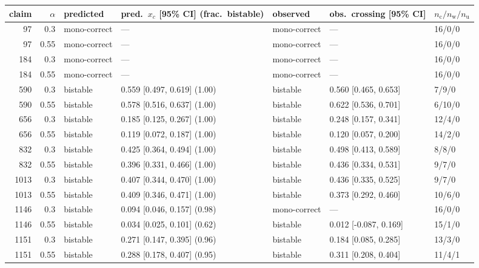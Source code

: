 \begin{tabular}{rrlllll}
\toprule
claim & $\alpha$ & predicted & pred.\ $x_c$ [95\% CI] (frac.\ bistable) & observed & obs.\ crossing [95\% CI] & $n_{\mathrm{c}}/n_{\mathrm{w}}/n_{\mathrm{u}}$ \\
\midrule
97 & 0.3 & mono-correct & --- & mono-correct & --- & 16/0/0 \\
97 & 0.55 & mono-correct & --- & mono-correct & --- & 16/0/0 \\
184 & 0.3 & mono-correct & --- & mono-correct & --- & 16/0/0 \\
184 & 0.55 & mono-correct & --- & mono-correct & --- & 16/0/0 \\
590 & 0.3 & bistable & 0.559 [0.497, 0.619] (1.00) & bistable & 0.560 [0.465, 0.653] & 7/9/0 \\
590 & 0.55 & bistable & 0.578 [0.516, 0.637] (1.00) & bistable & 0.622 [0.536, 0.701] & 6/10/0 \\
656 & 0.3 & bistable & 0.185 [0.125, 0.267] (1.00) & bistable & 0.248 [0.157, 0.341] & 12/4/0 \\
656 & 0.55 & bistable & 0.119 [0.072, 0.187] (1.00) & bistable & 0.120 [0.057, 0.200] & 14/2/0 \\
832 & 0.3 & bistable & 0.425 [0.364, 0.494] (1.00) & bistable & 0.498 [0.413, 0.589] & 8/8/0 \\
832 & 0.55 & bistable & 0.396 [0.331, 0.466] (1.00) & bistable & 0.436 [0.334, 0.531] & 9/7/0 \\
1013 & 0.3 & bistable & 0.407 [0.344, 0.470] (1.00) & bistable & 0.436 [0.335, 0.525] & 9/7/0 \\
1013 & 0.55 & bistable & 0.409 [0.346, 0.471] (1.00) & bistable & 0.373 [0.292, 0.460] & 10/6/0 \\
1146 & 0.3 & bistable & 0.094 [0.046, 0.157] (0.98) & mono-correct & --- & 16/0/0 \\
1146 & 0.55 & bistable & 0.034 [0.025, 0.101] (0.62) & bistable & 0.012 [-0.087, 0.169] & 15/1/0 \\
1151 & 0.3 & bistable & 0.271 [0.147, 0.395] (0.96) & bistable & 0.184 [0.085, 0.285] & 13/3/0 \\
1151 & 0.55 & bistable & 0.288 [0.178, 0.407] (0.95) & bistable & 0.311 [0.208, 0.404] & 11/4/1 \\
\bottomrule
\end{tabular}
